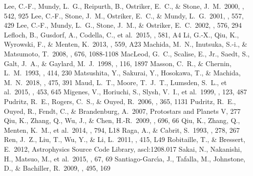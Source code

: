 \documentclass[twocolumn]{aastex62}
\begin{document}
\begin{CJK*}{UTF8}{gbsn}
\begin{thebibliography}{}
 Lee, C.-F., Mundy, L.~G., Reipurth, B., Ostriker, E.~C., \& Stone, J.~M.\ 2000, \apj, 542, 925
 Lee, C.-F., Stone, J.~M., Ostriker, E.~C., \& Mundy, L.~G.\ 2001, \apj, 557, 429 
 Lee, C.-F., Mundy, L.~G., Stone, J.~M., \& Ostriker, E.~C.\ 2002, \apj, 576, 294 
 Lefloch, B., Gusdorf, A., Codella, C., et al.\ 2015, \aap, 581, A4
 Li, G.-X., Qiu, K., Wyrowski, F., \& Menten, K.\ 2013, \aap, 559, A23 
 Machida, M.~N., Inutsuka, S.-i., \& Matsumoto, T.\ 2008, \apj, 676, 1088-1108  
 MacLeod, G.~C., Scalise, E., Jr., Saedt, S., Galt, J.~A., \& Gaylard, M.~J.\ 1998, \aj, 116, 1897 
 Masson, C.~R., \& Chernin, L.~M.\ 1993, \apj, 414, 230 
 Matsushita, Y., Sakurai, Y., Hosokawa, T., \& Machida, M.~N.\ 2018, \mnras, 475, 391 
 Maud, L.~T., Moore, T.~J.~T., Lumsden, S.~L., et al.\ 2015, \mnras, 453, 645
 Migenes, V., Horiuchi, S., Slysh, V.~I., et al.\ 1999, \apjs, 123, 487
 Pudritz, R.~E., Rogers, C.~S., \& Ouyed, R.\ 2006, \mnras, 365, 1131 
 Pudritz, R.~E., Ouyed, R., Fendt, C., \& Brandenburg, A.\ 2007, Protostars and Planets V, 277
 Qiu, K., Zhang, Q., Wu, J., \& Chen, H.-R.\ 2009, \apj, 696, 66
 Qiu, K., Zhang, Q., Menten, K.~M., et al.\ 2014, \apjl, 794, L18 
 Raga, A., \& Cabrit, S.\ 1993, \aap, 278, 267 
 Ren, J.~Z., Liu, T., Wu, Y., \& Li, L.\ 2011, \mnras, 415, L49 
 Robitaille, T., \& Bressert, E.\ 2012, Astrophysics Source Code Library, ascl:1208.017 
 Sakai, N., Nakanishi, H., Matsuo, M., et al.\ 2015, \pasj, 67, 69
 Santiago-Garc{\'{\i}}a, J., Tafalla, M., Johnstone, D., \& Bachiller, R.\ 2009, \aap, 495, 169

\end{thebibliography}
\end{CJK*}
\end{document}

